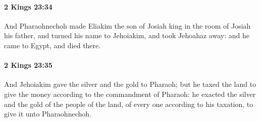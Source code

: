 		\paragraph{2 Kings 23:34} %
			\label{2KINGS-23-34}

			And Pharaohnechoh made Eliakim the son of Josiah king in the room of Josiah his father, and turned his name to Jehoiakim, and took Jehoahaz away: and he came to Egypt, and died there.


		\paragraph{2 Kings 23:35} %
			\label{2KINGS-23-35}

			And Jehoiakim gave the silver and the gold to Pharaoh; but he taxed the land to give the money according to the commandment of Pharaoh: he exacted the silver and the gold of the people of the land, of every one according to his taxation, to give it unto Pharaohnechoh.

